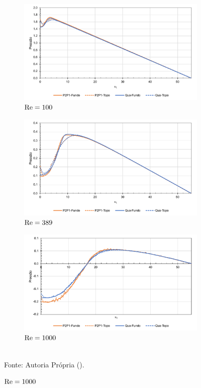 \begin{figure}[h!]
    \centering
    \caption{Escoamento em degrau invertido - Distribuição de pressões.}
    \begin{subfigure}{0.65\textwidth}
        \includegraphics[width=\linewidth]{Figuras/backwardFacingStep/pre100.pdf}
        \caption{$\mathrm{Re}=100$}
    \end{subfigure}
    \begin{subfigure}{0.65\textwidth}
        \includegraphics[width=\linewidth]{Figuras/backwardFacingStep/pre389.pdf}
        \caption{$\mathrm{Re}=389$}
    \end{subfigure}
    \begin{subfigure}{0.65\textwidth}
        \includegraphics[width=\linewidth]{Figuras/backwardFacingStep/pre1000.pdf}
        \caption{$\mathrm{Re}=1000$}
    \end{subfigure}
    \\Fonte: Autoria Própria (\the\year).
    \label{fig:BFSpre}
\end{figure}

